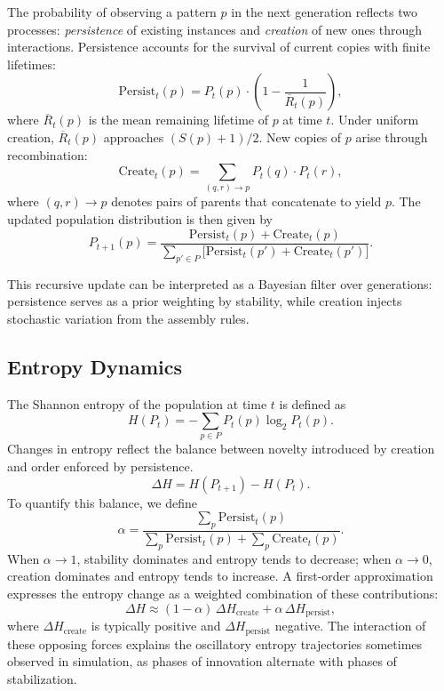 \documentclass[life,article,submit,pdftex,moreauthors]{Definitions/mdpi}
\begin{document}
The probability of observing a pattern $p$ in the next generation reflects two processes: 
\textit{persistence} of existing instances and \textit{creation} of new ones through interactions. 
Persistence accounts for the survival of current copies with finite lifetimes:
\begin{equation}
\label{eq:persist-term}
\mathrm{Persist}_t(p) = P_t(p) \cdot \left(1 - \frac{1}{\overline{R}_t(p)}\right),
\end{equation}
where $\overline{R}_t(p)$ is the mean remaining lifetime of $p$ at time $t$. 
Under uniform creation, $\overline{R}_t(p)$ approaches $(S(p)+1)/2$.  New copies of $p$ arise through recombination:
\begin{equation}
\label{eq:create-term}
\mathrm{Create}_t(p) = \sum_{(q,r) \to p} P_t(q) \cdot P_t(r),
\end{equation}
where $(q,r) \to p$ denotes pairs of parents that concatenate to yield $p$. The updated population distribution is then given by
\begin{equation}
\label{eq:full-ba-update}
P_{t+1}(p) = \frac{\mathrm{Persist}_t(p) + \mathrm{Create}_t(p)}
{\sum_{p' \in P} \big[\mathrm{Persist}_t(p') + \mathrm{Create}_t(p')\big]}.
\end{equation}

This recursive update can be interpreted as a Bayesian filter over generations: persistence serves as a prior weighting by stability, while creation injects stochastic variation from the assembly rules. 

\subsection{Entropy Dynamics}

The Shannon entropy of the population at time $t$ is defined as
\begin{equation}
H(P_t) = - \sum_{p \in P} P_t(p) \log_2 P_t(p).
\end{equation}
Changes in entropy reflect the balance between novelty introduced by creation and order enforced by persistence.
\begin{equation}
\Delta H = H(P_{t+1}) - H(P_t).
\end{equation}
To quantify this balance, we define
\begin{equation}
\alpha = \frac{\sum_p \mathrm{Persist}_t(p)}
{\sum_p \mathrm{Persist}_t(p) + \sum_p \mathrm{Create}_t(p)}.
\end{equation}
When $\alpha \to 1$, stability dominates and entropy tends to decrease; when $\alpha \to 0$, creation dominates and entropy tends to increase.  
A first-order approximation expresses the entropy change as a weighted combination of these contributions:
\begin{equation}
\Delta H \approx (1 - \alpha)\,\Delta H_{\text{create}} + \alpha\,\Delta H_{\text{persist}},
\end{equation}
where $\Delta H_{\text{create}}$ is typically positive and $\Delta H_{\text{persist}}$ negative.  The interaction of these opposing forces explains the oscillatory entropy trajectories sometimes observed in simulation, as phases of innovation alternate with phases of stabilization.
\end{document}
